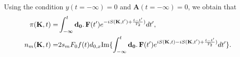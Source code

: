 \documentclass[a4paper,11pt]{report}
\renewcommand{\vec}[1]{\mathbf{#1}}
\begin{document}
Using the condition $y(t=-\infty)=0$ and $\vec{A}(t=-\infty)=0$, we obtain that
% 
\begin{subequations}
 \begin{align}
 \pi(\vec{K},t) =& \int_{-\infty}^{t}\vec{d_{0}}\ldotp\vec{F}(t')e^{-iS(\vec{K},t')+\frac{t-t'}{T_2})}dt', \\
 n_m(\vec{K},t) =& 2s_m F_0f(t)d_{0,x}\mathrm{Im}\{\int_{-\infty}^{t}\vec{d_{0}}\ldotp\vec{F}(t')e^{iS(\vec{K},t)-iS(\vec{K},t')+\frac{t-t'}{T_2})}dt'\} . 
 \end{align}
\end{subequations}
% 
% 
\end{document}
